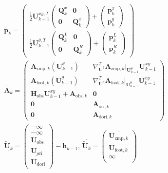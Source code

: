 \begin{align}
	&\tilde{\bm{p}}_k = \begin{pmatrix}
		\frac{1}{2}\bm{U}_{k-1}^{xy,T}\begin{pmatrix}
			\bm{Q}_k^x & \bm{0} \\
			\bm{0} & \bm{Q}_k^x
		\end{pmatrix} + \begin{pmatrix}
			\bm{p}_k^x \\ \bm{p}_k^y
		\end{pmatrix} \\
			\frac{1}{2}\bm{U}_{k-1}^{\theta,T}\begin{pmatrix}
			\bm{Q}_k^L & \bm{0} \\
			\bm{0} & \bm{Q}_k^R
		\end{pmatrix} + \begin{pmatrix}
			\bm{p}_k^L \\ \bm{p}_k^R
		\end{pmatrix} 
	\end{pmatrix} \\
	&\tilde{\bm{A}}_k = \begin{pmatrix}
		\bm{A}_{\text{zmp},k}(\bm{U}_{k-1}^\theta) & \nabla^T_{\bm{U}^\theta}\bm{A}_{\text{zmp},k}|_{\bm{U}_{k-1}^\theta}\bm{U}^{xy}_{k-1} \\
		\bm{A}_{\text{foot},k}(\bm{U}_{k-1}^\theta) & \nabla^T_{\bm{U}^\theta}\bm{A}_{\text{foot},k}|_{\bm{U}_{k-1}^\theta}\bm{U}^{xy}_{k-1} \\
		\bm{H}_\text{obs}\bm{U}^{xy}_{k-1}+\bm{A}_{\text{obs},k} & \bm{0} \\
		\bm{0} & \bm{A}_{\text{ori},k} \\
		\bm{0} & \bm{A}_{\text{dori},k}
	\end{pmatrix} \\
	&\underline{\tilde{\bm{U}}_k} = \begin{pmatrix}
		-\infty \\
		-\infty \\
		\underline{{\bm{U}}_\text{obs}}\\
		\underline{{\bm{U}}_\text{ori}}\\
		\underline{{\bm{U}}_\text{dori}}
	\end{pmatrix}-\bm{h}_{k-1},\,\overline{\tilde{\bm{U}}_k} = \begin{pmatrix}
		\overline{\bm{U}_{\text{zmp},k}}\\
		\overline{\bm{U}_{\text{foot},k}}\\
		\infty\\

\end{pmatrix}
\end{align}
